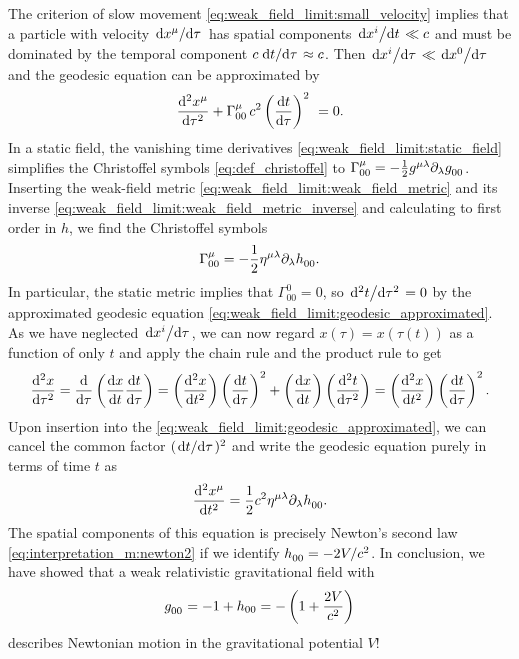 The criterion of slow movement \cref{eq:weak_field_limit:small_velocity} implies that a particle with velocity $\odv{x^\mu}/{\tau}$ has spatial components $\odv{x^i}/{t} \ll c$ and must be dominated by the temporal component $c \odv{t}/{\tau} \approx c$.
Then $\odv{x^i}/{\tau} \ll \odv{x^0}/{\tau}$ and the geodesic equation can be approximated by
\begin{equation}
	\odv[2]{x^\mu}{\tau} + \Gamma^\mu_{00} \, c^2 \left( \odv{t}{\tau} \right)^2 = 0 .
	\label{eq:weak_field_limit:geodesic_approximated}
\end{equation}
In a static field, the vanishing time derivatives \eqref{eq:weak_field_limit:static_field} simplifies the Christoffel symbols \eqref{eq:def_christoffel} to $\Gamma^\mu_{00} = -\frac{1}{2} g\indices{^\mu^\lambda} \partial_\lambda g\indices{_0_0}$.
Inserting the weak-field metric \eqref{eq:weak_field_limit:weak_field_metric} and its inverse \eqref{eq:weak_field_limit:weak_field_metric_inverse} and calculating to first order in $h$, we find the Christoffel symbols
\begin{equation}
	\Gamma^\mu_{00} = -\frac{1}{2} \eta\indices{^\mu^\lambda} \partial_\lambda h\indices{_0_0} .
	\label{eq:weak_field_limit:static_christoffel_symbols}
\end{equation}
In particular, the static metric implies that $\Gamma^0_{00} = 0$, so $\odv[2]{t}/{\tau} = 0$ by the approximated geodesic equation \eqref{eq:weak_field_limit:geodesic_approximated}.
As we have neglected $\odv{x^i}/{\tau}$, we can now regard $x(\tau) = x(\tau(t))$ as a function of only $t$ and apply the chain rule and the product rule to get 
\begin{equation}
	\odv[2]{x}{\tau} = \odv*{\left( \odv{x}{t} \odv{t}{\tau} \right)}{\tau} = \left( \odv[2]{x}{t} \right) \left( \odv{t}{\tau} \right)^2 + \left( \odv{x}{t} \right) \left( \odv[2]{t}{\tau} \right) = \left( \odv[2]{x}{t} \right) \left( \odv{t}{\tau} \right)^2 .
\end{equation}
Upon insertion into the \cref{eq:weak_field_limit:geodesic_approximated}, we can cancel the common factor $(\odv{t}/{\tau})^2$ and write the geodesic equation purely in terms of time $t$ as
\begin{equation*}
	\odv[2]{x^\mu}{t} = \frac{1}{2} c^2 \eta\indices{^\mu^\lambda} \partial_\lambda h\indices{_0_0} .
\end{equation*}
The spatial components of this equation is precisely Newton's second law \cref{eq:interpretation_m:newton2} if we identify $h\indices{_0_0} = -2V/c^2$.
In conclusion, we have showed that a weak relativistic gravitational field with
\begin{equation}
	g\indices{_0_0} = -1 + h_{00} = - \left( 1 + \frac{2V}{c^2} \right)
	\label{eq:weak_field_limit:metric_with_potential}
\end{equation}
describes Newtonian motion in the gravitational potential $V$!


